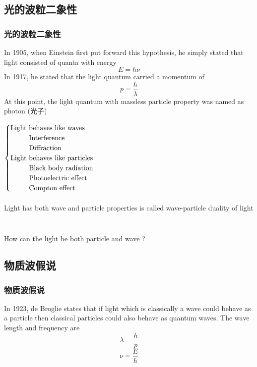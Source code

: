 \subsection{光的波粒二象性} 

\begin{frame} 
  \frametitle{光的波粒二象性}  
  {\Bullet} In 1905, when Einstein first put forward this hypothesis, 
  he simply stated that light consisted of quanta with energy \[ E = h\nu \] 
  {\Bullet} In 1917, he stated that the light quantum carried a momentum of  \[ p=\frac{h}{\lambda}\]
  At this point, the light quantum with massless particle property was named as photon (光子)
\end{frame}

\begin{frame}  
  $\begin{cases}
    \text{Light behaves like waves }\\
    \text{~~\qquad Interference} \\
    \text{~~\qquad Diffraction} \\
    \text{Light behaves like particles}\\
    \text{~~\qquad Black body radiation} \\
    \text{~~\qquad Photoelectric effect} \\
    \text{~~\qquad Compton effect} \\
   \end{cases}$\\
   ~~\\
   Light has both wave and particle properties is called \alert{wave-particle duality} of light
\end{frame}

\begin{frame}
    \frametitle{}
    \begin{tcolorbox3}[学术讨论]
        ~\\
        How can the light be both particle and wave ?
    \end{tcolorbox3}
\end{frame}

\subsection{物质波假说}

\begin{frame}   
  \frametitle{物质波假说}
  \begin{tcolorbox4}
  In 1923, de Broglie states that if light which is classically a wave could behave as a particle
  then classical particles could also behave as quantum waves. The wave length and frequency are
  \[\lambda=\frac{h}{p}\]
  \[\nu =\frac{E}{h}\]
  \end{tcolorbox4}
\end{frame}

